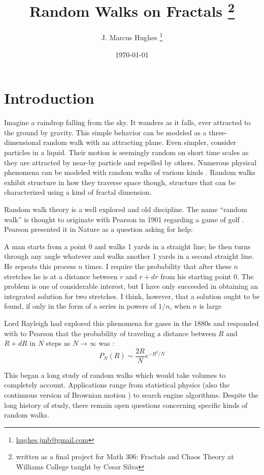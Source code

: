 \documentclass{article}
\title{Random Walks on Fractals \thanks{written as a final project for Math 306: Fractals and Chaos Theory at Williams College taught by Cesar Silva}}
\date{\today}
\author{J. Marcus Hughes \thanks{\href{mailto:hughes.jmb@gmail.com}{hughes.jmb@gmail.com}}}
\begin{document}
\maketitle

\section{Introduction}
Imagine a raindrop falling from the sky. It wanders as it falls, ever attracted to the ground by gravity. This simple behavior can be modeled as a three-dimensional random walk with an attracting plane. Even simpler, consider particles in a liquid. Their motion is seemingly random on short time scales as they are attracted by near-by particle and repelled by others. Numerous physical phenomena can be modeled with random walks of various kinds \cite{haw05, mandelbrot83}. Random walks exhibit structure in how they traverse space though, structure that can be characterized using a kind of fractal dimension. 

Random walk theory is a well explored and old discipline. The name ``random walk''  is thought to originate with Pearson in 1901 regarding a game of golf \cite{carazza77}. Pearson presented it in Nature as a question asking for help:
\begin{displayquote}
A man starts from a point 0 and walks 1 yards in a straight line; he then
turns through any angle whatever and walks another 1 yards in a second
straight line. He repeats this process $n$ times. I require the probability that
after these $n$ stretches he is at a distance between $r$ and $r+dr$ from his
starting point 0. The problem is one of considerable interest, but I have only
succeeded in obtaining an integrated solution for two stretches. I think, however,
that a solution ought to be found, if only in the form of a series in powers of
$1/n$, when $n$ is large
\end{displayquote}

Lord Rayleigh had explored this phenomena for gases in the 1880s \cite{rayleigh1880} and responded with to Pearson that the probability of traveling a distance between $R$ and $R+dR$ in $N$ steps as $N \rightarrow \infty$ was \cite{rayleigh1919}:
\begin{equation}
P_N(R) \sim \frac{2R}{N} e^{-R^2/N}
\end{equation}

This began a long study of random walks which would take volumes to completely account. Applications range from statistical physics (also the continuous version of Brownian motion \cite{einstein1905}) to search engine algorithms. Despite the long history of study, there remain open questions concerning specific kinds of random walks. 
\end{document}
